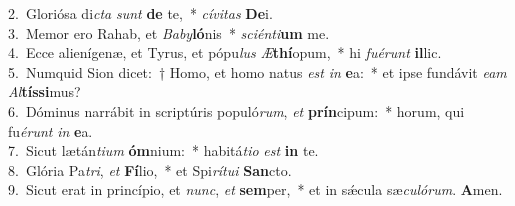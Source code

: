 {2.~}Gloriósa di\textit{cta} \textit{sunt} \textbf{de} te,~* \textit{cí}\textit{vi}\textit{tas} \textbf{De}i.\\
{3.~}Memor ero Rahab, et \textit{Ba}\textit{by}\textbf{ló}nis~* \textit{sci}\textit{én}\textit{ti}\textbf{um} me.\\
{4.~}Ecce alienígenæ, et Tyrus, et pópu\textit{lus} \textit{Æ}\textbf{thí}opum,~* hi \textit{fu}\textit{é}\textit{runt} \textbf{il}lic.\\
{5.~}Numquid Sion dicet:~† Homo, et homo natus \textit{est} \textit{in} \textbf{e}a:~* et ipse fundávit \textit{e}\textit{am} \textit{Al}\textbf{tís}\textbf{si}mus?\\
{6.~}Dóminus narrábit in scriptúris populó\textit{rum}, \textit{et} \textbf{prín}cipum:~* horum, qui fu\textit{é}\textit{runt} \textit{in} \textbf{e}a.\\
{7.~}Sicut lætán\textit{ti}\textit{um} \textbf{óm}nium:~* habitá\textit{ti}\textit{o} \textit{est} \textbf{in} te.\\
{8.~}Glória Pa\textit{tri}, \textit{et} \textbf{Fí}lio,~* et Spi\textit{rí}\textit{tu}\textit{i} \textbf{San}cto.\\
{9.~}Sicut erat in princípio, et \textit{nunc}, \textit{et} \textbf{sem}per,~* et in sǽcula sæ\textit{cu}\textit{ló}\textit{rum}. \textbf{A}men.\\

